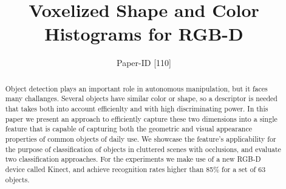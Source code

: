 \documentclass[conference]{sty/IEEEtran}
\begin{document}
\title{Voxelized Shape and Color Histograms for RGB-D}

\author{Paper-ID [110]}


\newcommand{\todo}[1]{\textbf{\textcolor{red}{TODO: #1}}}
\maketitle

\begin{abstract}
Object detection plays an important role in autonomous manipulation,
but it faces many challanges. Several objects have similar color
or shape, so a descriptor is needed that takes both into account
efficienlty and with high discriminating power. In this paper we
present an approach to efficiently capture these two dimensions
into a single feature
that is capable of capturing both the geometric and visual appearance
properties of common objects of daily use. We showcase the
feature's applicability for the purpose of classification of objects in cluttered scenes with occlusions,
and evaluate two classification approaches.
For the experiments we make use of a new RGB-D device called Kinect, and achieve recognition
rates higher than 85\% for a set of 63 objects.
\end{abstract}
\end{document}
